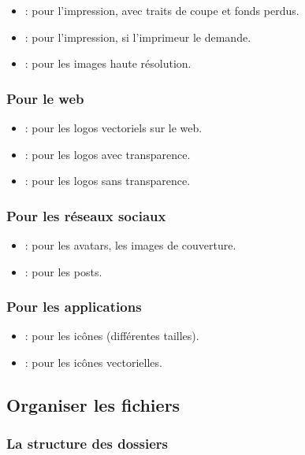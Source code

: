\begin{itemize}
    \item {} : pour l'impression, avec traits de coupe et fonds perdus.
    \item {} : pour l'impression, si l'imprimeur le demande.
    \item {} : pour les images haute résolution.
\end{itemize}

\subsubsection{Pour le web}

\begin{itemize}
    \item {} : pour les logos vectoriels sur le web.
    \item {} : pour les logos avec transparence.
    \item {} : pour les logos sans transparence.
\end{itemize}

\subsubsection{Pour les réseaux sociaux}

\begin{itemize}
    \item {} : pour les avatars, les images de couverture.
    \item {} : pour les posts.
\end{itemize}

\subsubsection{Pour les applications}

\begin{itemize}
    \item {} : pour les icônes (différentes tailles).
    \item {} : pour les icônes vectorielles.
\end{itemize}

\subsection{Organiser les fichiers}

\subsubsection{La structure des dossiers}

